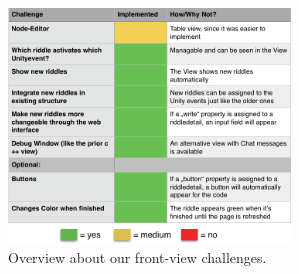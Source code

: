 \begin{figure}[th]
	\centering
	\includegraphics[width=75mm,scale=0.75]{Figures/frontendOverview}
	\decoRule
	\caption[FrontViewTable]{Overview about our front-view challenges.}
	\label{fig:FrontViewTable}
\end{figure}


